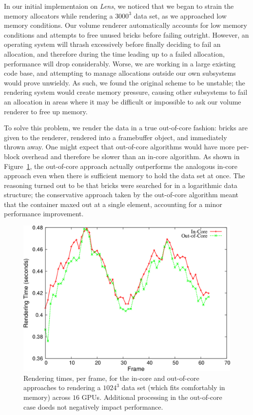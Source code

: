 In our initial implementaion on \textit{Lens}, we noticed that we
began to strain the memory allocators while rendering a $3000^3$ data
set, as we approached low memory conditions.  Our volume renderer
automatically accounts for low memory conditions and attempts to free
unused bricks before failing outright.  However, an operating system
will thrash excessively before finally deciding to fail an allocation,
and therefore during the time leading up to a failed allocation,
performance will drop considerably.  Worse, we are working in a large
existing code base, and attempting to manage allocations outside our
own subsystems would prove unwieldy.  As such, we found the original
scheme to be unstable; the rendering system would create memory
pressure, causing other subsystems to fail an allocation in areas where
it may be difficult or impossible to ask our volume renderer to free up
memory.

To solve this problem, we render the data in a true out-of-core
fashion: bricks are given to the renderer, rendered into a framebuffer object,
and immediately thrown away.  One might expect that out-of-core algorithms would
have more per-block overhead and therefore be slower than an in-core algorithm.
As shown in Figure~\ref{fig:ooc}, the out-of-core approach actually
outperforms the analogous in-core approach even when there is
sufficient memory to hold the data set at once.  The reasoning
turned out to be that bricks were searched for in a logarithmic data
structure; the conservative approach taken by the out-of-core algorithm
meant that the container maxed out at a single element, accounting for
a minor performance improvement.

\begin{figure}
  \includegraphics[width=\linewidth]{images/multiscale/ooc}
  \caption{Rendering times, per frame, for the in-core and out-of-core
  approaches to rendering a $1024^3$ data set (which fits comfortably
  in memory) across $16$ GPUs.  Additional processing in the
  out-of-core case doeds not negatively impact performance.}
  \label{fig:ooc}
\end{figure}


